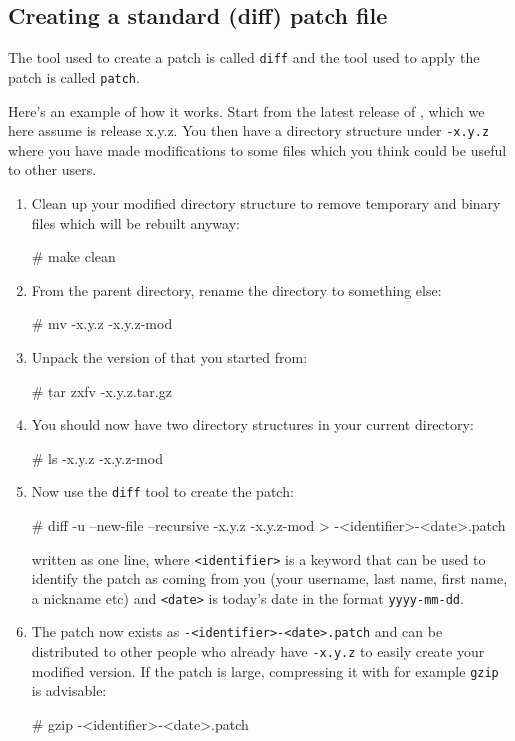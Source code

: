   
\subsection{Creating a standard (diff) patch file}

The tool used to create a patch is called \texttt{diff} and the tool
used to apply the patch is called \texttt{patch}.

Here's an example of how it works. Start from the latest release of
\package{}, which we here assume is release x.y.z. You then have a
directory structure under \texttt{\packagett{}-x.y.z} where you have made
modifications to some files which you think could be useful to
other users.

\begin{enumerate}
\item
  Clean up your modified directory structure to remove temporary and binary
  files which will be rebuilt anyway:
  \begin{code}
# make clean
  \end{code}
\item
  From the parent directory, rename the \package{} directory to something else:
  \begin{macrocode}
# mv \packagett{}-x.y.z \packagett{}-x.y.z-mod
  \end{macrocode}
\item
  Unpack the version of \package{} that you started from:
  \begin{macrocode}
# tar zxfv \packagett{}-x.y.z.tar.gz
  \end{macrocode}
\item
  You should now have two \package{} directory structures in your current directory:
  \begin{macrocode}
# ls
\packagett{}-x.y.z
\packagett{}-x.y.z-mod
  \end{macrocode}
\item
  Now use the \texttt{diff} tool to create the patch:
  \begin{macrocode}
# diff -u --new-file --recursive \packagett{}-x.y.z
  \packagett{}-x.y.z-mod > \packagett{}-<identifier>-<date>.patch
  \end{macrocode}
  written as one line, where \texttt{<identifier>} is a keyword that
  can be used to identify the patch as coming from you (your username,
  last name, first name, a nickname etc) and \texttt{<date>} is
  today's date in the format \texttt{yyyy-mm-dd}.
\item
  The patch now exists as \texttt{\packagett{}-<identifier>-<date>.patch}
  and can be distributed to other people who already have
  \texttt{\packagett{}-x.y.z} to easily create your modified version. If the
  patch is large, compressing it with for example \texttt{gzip} is
  advisable:
  \begin{macrocode}
# gzip \packagett{}-<identifier>-<date>.patch
  \end{macrocode}
\end{enumerate}

